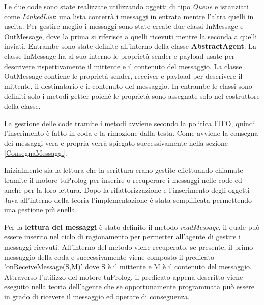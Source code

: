 \documentclass[12pt,a4paper,openright,twoside]{report}
\begin{document}
Le due code sono state realizzate utilizzando oggetti di tipo \textit{Queue} e istanziati come \textit{LinkedList}: una lista conterr\`a i messaggi in entrata mentre l'altra quelli in uscita. Per gestire meglio i messaggi sono state create due classi InMessage e OutMessage, dove la prima si riferisce a quelli ricevuti mentre la seconda a quelli inviati. Entrambe sono state definite all'interno della classe \textbf{AbstractAgent}.
La classe InMessage ha al suo interno le propriet\`a sender e payload usate per descrivere rispettivamente il mittente e il contenuto del messaggio.
La classe OutMessage contiene le propriet\`a sender, receiver e payload per descrivere il mittente, il destinatario e il contenuto del messaggio.
In entrambe le classi sono definiti solo i metodi getter poich\`e le propriet\`a sono assegnate solo nel costruttore della classe.

La gestione delle code tramite i metodi avviene secondo la politica FIFO, quindi l'inserimento \`e fatto in coda e la rimozione dalla testa. Come avviene la consegna dei messaggi vera e propria verr\`a spiegato successivamente nella sezione \ref{ConsegnaMessaggi}.

Inizialmente sia la lettura che la scrittura erano gestite effettuando chiamate tramite il motore tuProlog per inserire o recuperare i messaggi nelle code ed anche per la loro lettura. Dopo la rifattorizzazione e l'inserimento degli oggetti Java all'interno della teoria l'implementazione \`e stata semplificata permettendo una gestione pi\`u snella.

Per la \textbf{lettura dei messaggi} \`e stato definito il metodo \textit{readMessage}, il quale pu\`o essere inserito nel ciclo di ragionamento per permetter all'agente di gestire i messaggi ricevuti.
All'interno del metodo viene recuperato, se presente, il primo messaggio della coda e successivamente viene composto il predicato 'onReceiveMessage(S,M)' dove S \`e il mittente e M \`e il contenuto del messaggio.
Attraverso l'utilizzo del motore tuProlog, il predicato appena descritto viene eseguito nella teoria dell'agente che se opportunamente programmata pu\`o essere in grado di ricevere il messaggio ed operare di conseguenza.
\end{document}
